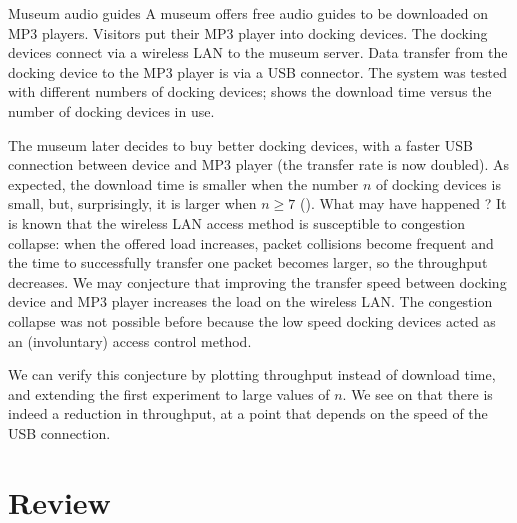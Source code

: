 \begin{ex}{Museum audio guides} A museum offers free
audio guides to be downloaded on MP3 players.
Visitors put their MP3 player into docking
devices. The docking devices connect via a
wireless LAN to the museum server. Data transfer
from the docking device to the MP3 player is via
a USB connector. The system was tested with
different numbers of docking devices;
 shows the download time
versus the number of docking devices in use.

The museum later decides to buy better docking
devices, with a faster USB connection between
device and MP3 player (the transfer rate is now
doubled). As expected, the download time is
smaller when the number $n$ of docking devices is
small, but, surprisingly, it is larger when $n
\geq 7$ (). What may have
happened ? It is known that the wireless LAN
access method is susceptible to congestion
collapse: when the offered load increases, packet
collisions become frequent and the time to
successfully transfer one packet becomes larger,
so the throughput decreases. We may conjecture
that improving the transfer speed between docking
device and MP3 player increases the load on the
wireless LAN. The congestion collapse was not
possible before because the low speed docking
devices acted as an (involuntary) access control
method.

We can verify this conjecture by plotting
throughput instead of download time, and
extending the first experiment to large values of
$n$. We see on  that there is
indeed a reduction in throughput, at a point that
depends on the speed of the USB connection.
\end{ex}
\begin{figure}[htbp]
\begin{center}
        \protect\label{fig-museum}
\end{center}
\end{figure}

\section{Review}

